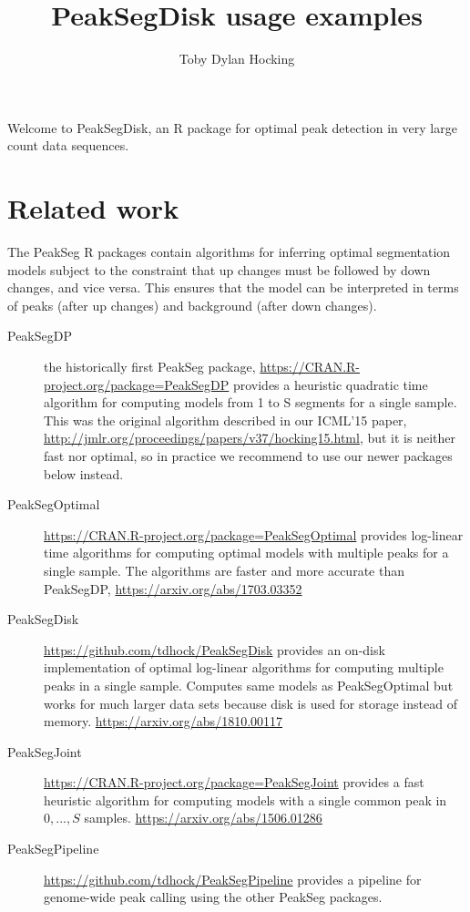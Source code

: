 \documentclass[12pt]{article}\usepackage[]{graphicx}\usepackage[]{color}
\begin{document}
\title{PeakSegDisk usage examples}
\author{Toby Dylan Hocking}
\maketitle

Welcome to PeakSegDisk, an R package for optimal peak
detection in very large count data sequences. 



\section{Related work}

The PeakSeg R packages contain algorithms for inferring optimal
segmentation models subject to the constraint that up changes must be
followed by down changes, and vice versa. This ensures that the model
can be interpreted in terms of peaks (after up changes) and background
(after down changes). 

\begin{description}
\item[PeakSegDP] the historically first PeakSeg package,
  \url{https://CRAN.R-project.org/package=PeakSegDP} provides a
  heuristic quadratic time algorithm for computing models from 1 to S
  segments for a single sample. This was the original algorithm
  described in our ICML'15 paper,
  \url{http://jmlr.org/proceedings/papers/v37/hocking15.html}, but it
  is neither fast nor optimal, so in practice we recommend to use our
  newer packages below instead.
\item[PeakSegOptimal]
  \url{https://CRAN.R-project.org/package=PeakSegOptimal} provides
  log-linear time algorithms for computing optimal models with
  multiple peaks for a single sample. The algorithms are faster and
  more accurate than PeakSegDP, \url{https://arxiv.org/abs/1703.03352}
\item[PeakSegDisk] \url{https://github.com/tdhock/PeakSegDisk}
  provides an on-disk implementation of optimal log-linear algorithms
  for computing multiple peaks in a single sample. Computes same
  models as PeakSegOptimal but works for much larger data sets because
  disk is used for storage instead of memory.
  \url{https://arxiv.org/abs/1810.00117}
\item[PeakSegJoint] \url{https://CRAN.R-project.org/package=PeakSegJoint}
  provides a fast heuristic algorithm for computing models with a single
  common peak in $0,...,S$
  samples. \url{https://arxiv.org/abs/1506.01286}
\item[PeakSegPipeline]
  \url{https://github.com/tdhock/PeakSegPipeline} provides a pipeline
  for genome-wide peak calling using the other PeakSeg packages. 
\end{description}
\end{document}
